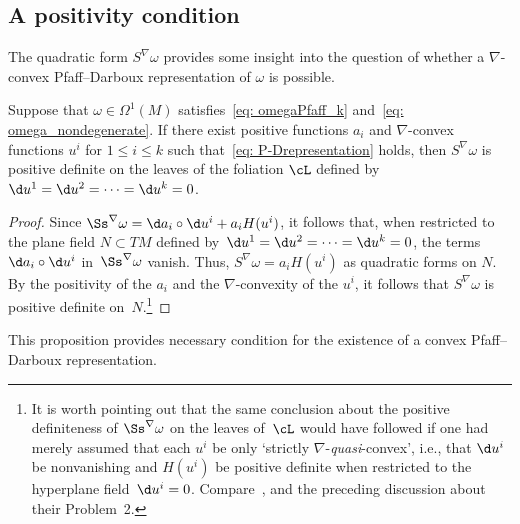 \subsection{A positivity condition}\label{ssec: poscond}
The quadratic form $S^\nabla\omega$ provides some insight
into the question of whether a $\nabla$-convex Pfaff--Darboux
representation of $\omega$ is possible.

\begin{Proposition}\label{prop: ness cond}
Suppose that $\omega\in\Omega^1(M)$ satisfies~\eqref{eq: omegaPfaff_k}
and~\eqref{eq: omega_nondegenerate}. If there exist positive
functions $a_i$ and $\nabla$-convex functions $u^i$ for $1\le i\le k$
such that~\eqref{eq: P-Drepresentation} holds, then $S^\nabla\omega$
is positive definite on the leaves of the foliation $\cL$ defined by
$\d u^1 = \d u^2 = \cdots = \d u^k = 0$.
\end{Proposition}

\begin{proof}
Since $\Ss^\nabla\omega =\d a_i\circ \d u^i + a_i H(u^i)$,
it follows that, when restricted to the plane field ${N\subset TM}$
defined by~$\d u^1 = \d u^2 = \cdots = \d u^k = 0$,
the terms~$\d a_i\circ \d u^i$ in~$\Ss^\nabla\omega$
vanish. Thus, $S^\nabla\omega = a_i H(u^i)$
as quadratic forms on $N$. By the positivity of the $a_i$
and the $\nabla$-convexity of the $u^i$, it follows that
$S^\nabla\omega$ is positive definite on~$N$.\footnote{It is worth pointing out that the same conclusion
about the positive definiteness of $\Ss^\nabla\omega$ on the leaves of~$\cL$
would have followed if one had merely assumed that each $u^i$
be only `strictly $\nabla$-\emph{quasi}-convex',
i.e., that $\d u^i$ be nonvanishing and $H(u^i)$ be positive definite
when restricted to the hyperplane field~$\d u^i = 0$.
Compare~\cite[Lemma~1]{MR2023129},
and the preceding discussion about their Problem~2.}
\end{proof}

This proposition provides necessary condition for the existence
of a convex Pfaff--Darboux representation.

